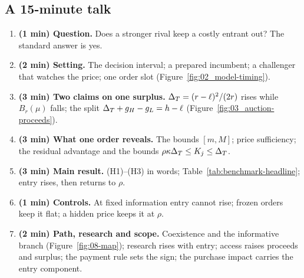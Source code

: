 \subsection{A 15-minute talk}\label{sec:13_panel-talk}

\begin{enumerate}[nosep]
\item \textbf{(1 min) Question.} Does a stronger rival keep a costly entrant out? The standard answer is yes.
\item \textbf{(2 min) Setting.} The decision interval; a prepared incumbent; a challenger that watches the price; one
order slot (Figure~\ref{fig:02_model-timing}).
\item \textbf{(3 min) Two claims on one surplus.} \(\Delta_T=(r-\ell)^2/(2r)\) rises while \(B_r(\mu)\) falls; the split
\(\Delta_T+g_H-g_L=h-\ell\) (Figure~\ref{fig:03_auction-proceeds}).
\item \textbf{(3 min) What one order reveals.} The bounds \([m,M]\); price sufficiency; the residual advantage and the
bounds \(\rho\kappa\Delta_T\le K_j\le\Delta_T\).
\item \textbf{(3 min) Main result.} (H1)--(H3) in words; Table~\ref{tab:benchmark-headline}; entry rises, then returns
to \(\rho\).
\item \textbf{(1 min) Controls.} At fixed information entry cannot rise; frozen orders keep it flat; a hidden price
keeps it at \(\rho\).
\item \textbf{(2 min) Path, research and scope.} Coexistence and the informative branch (Figure~\ref{fig:08-map});
research rises with entry; access raises proceeds and surplus; the payment rule sets the sign; the purchase impact
carries the entry component.
\end{enumerate}
